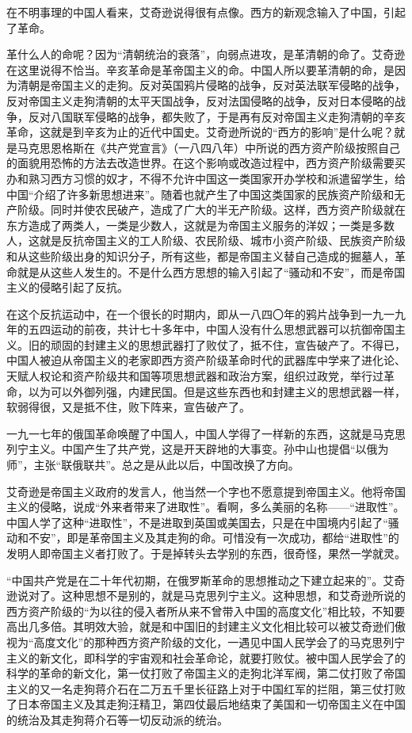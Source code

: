 在不明事理的中国人看来，艾奇逊说得很有点像。西方的新观念输入了中国，引起了革命。

革什么人的命呢？因为“清朝统治的衰落”，向弱点进攻，是革清朝的命了。艾奇逊在这里说得不恰当。辛亥革命是革帝国主义的命。中国人所以要革清朝的命，是因为清朝是帝国主义的走狗。反对英国鸦片侵略的战争，反对英法联军侵略的战争，反对帝国主义走狗清朝的太平天国战争，反对法国侵略的战争，反对日本侵略的战争，反对八国联军侵略的战争，都失败了，于是再有反对帝国主义走狗清朝的辛亥革命，这就是到辛亥为止的近代中国史。艾奇逊所说的“西方的影响”是什么呢？就是马克思恩格斯在《共产党宣言》（一八四八年）中所说的西方资产阶级按照自己的面貌用恐怖的方法去改造世界。在这个影响或改造过程中，西方资产阶级需要买办和熟习西方习惯的奴才，不得不允许中国这一类国家开办学校和派遣留学生，给中国“介绍了许多新思想进来”。随着也就产生了中国这类国家的民族资产阶级和无产阶级。同时并使农民破产，造成了广大的半无产阶级。这样，西方资产阶级就在东方造成了两类人，一类是少数人，这就是为帝国主义服务的洋奴；一类是多数人，这就是反抗帝国主义的工人阶级、农民阶级、城市小资产阶级、民族资产阶级和从这些阶级出身的知识分子，所有这些，都是帝国主义替自己造成的掘墓人，革命就是从这些人发生的。不是什么西方思想的输入引起了“骚动和不安”，而是帝国主义的侵略引起了反抗。

在这个反抗运动中，在一个很长的时期内，即从一八四〇年的鸦片战争到一九一九年的五四运动的前夜，共计七十多年中，中国人没有什么思想武器可以抗御帝国主义。旧的顽固的封建主义的思想武器打了败仗了，抵不住，宣告破产了。不得已，中国人被迫从帝国主义的老家即西方资产阶级革命时代的武器库中学来了进化论、天赋人权论和资产阶级共和国等项思想武器和政治方案，组织过政党，举行过革命，以为可以外御列强，内建民国。但是这些东西也和封建主义的思想武器一样，软弱得很，又是抵不住，败下阵来，宣告破产了。

一九一七年的俄国革命唤醒了中国人，中国人学得了一样新的东西，这就是马克思列宁主义。中国产生了共产党，这是开天辟地的大事变。孙中山也提倡“以俄为师”，主张“联俄联共”。总之是从此以后，中国改换了方向。

艾奇逊是帝国主义政府的发言人，他当然一个字也不愿意提到帝国主义。他将帝国主义的侵略，说成“外来者带来了进取性”。看啊，多么美丽的名称——“进取性”。中国人学了这种“进取性”，不是进取到英国或美国去，只是在中国境内引起了“骚动和不安”，即是革帝国主义及其走狗的命。可惜没有一次成功，都给“进取性”的发明人即帝国主义者打败了。于是掉转头去学别的东西，很奇怪，果然一学就灵。

“中国共产党是在二十年代初期，在俄罗斯革命的思想推动之下建立起来的”。艾奇逊说对了。这种思想不是别的，就是马克思列宁主义。这种思想，和艾奇逊所说的西方资产阶级的“为以往的侵入者所从来不曾带入中国的高度文化”相比较，不知要高出几多倍。其明效大验，就是和中国旧的封建主义文化相比较可以被艾奇逊们傲视为“高度文化”的那种西方资产阶级的文化，一遇见中国人民学会了的马克思列宁主义的新文化，即科学的宇宙观和社会革命论，就要打败仗。被中国人民学会了的科学的革命的新文化，第一仗打败了帝国主义的走狗北洋军阀，第二仗打败了帝国主义的又一名走狗蒋介石在二万五千里长征路上对于中国红军的拦阻，第三仗打败了日本帝国主义及其走狗汪精卫，第四仗最后地结束了美国和一切帝国主义在中国的统治及其走狗蒋介石等一切反动派的统治。

